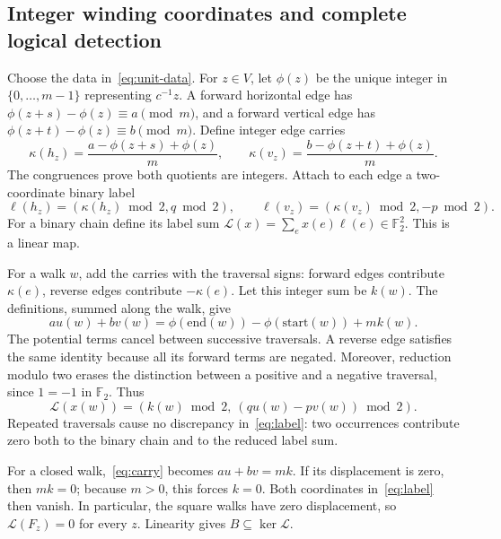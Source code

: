 \documentclass{article}
\numberwithin{equation}{section}
\begin{document}
\subsection{Integer winding coordinates and complete logical detection}\label{sec:I-winding}

Choose the data in~\eqref{eq:unit-data}. For \(z\in V\), let \(\phi(z)\) be the unique
integer in \(\{0,\ldots,m-1\}\) representing \(c^{-1}z\). A forward horizontal edge
has \(\phi(z+s)-\phi(z)\equiv a\pmod m\), and a forward vertical edge has
\(\phi(z+t)-\phi(z)\equiv b\pmod m\). Define integer edge carries
\begin{equation}\label{eq:carries}
  \kappa(h_z)=\frac{a-\phi(z+s)+\phi(z)}m,\qquad
  \kappa(v_z)=\frac{b-\phi(z+t)+\phi(z)}m.
\end{equation}
The congruences prove both quotients are integers. Attach to each edge a
two-coordinate binary label
\begin{equation}\label{eq:edge-labels}
  \ell(h_z)=(\kappa(h_z)\bmod2,q\bmod2),\qquad
  \ell(v_z)=(\kappa(v_z)\bmod2,-p\bmod2).
\end{equation}
For a binary chain define its label sum
\(\mathcal{L}(x)=\sum_e x(e)\ell(e)\in\mathbb F_2^2\). This is a linear map.

For a walk \(w\), add the carries with the traversal signs: forward edges
contribute \(\kappa(e)\), reverse edges contribute \(-\kappa(e)\). Let this
integer sum be \(k(w)\). The definitions, summed along the walk, give
\begin{equation}\label{eq:carry}
  a u(w)+b v(w)=\phi(\mathrm{end}(w))-\phi(\mathrm{start}(w))+m k(w).
\end{equation}
The potential terms cancel between successive traversals. A reverse edge
satisfies the same identity because all its forward terms are negated.
Moreover, reduction modulo two erases the distinction between a positive
and a negative traversal, since \(1=-1\) in \(\mathbb F_2\). Thus
\begin{equation}\label{eq:label}
  \mathcal{L}(x(w))=(k(w)\bmod2,\ (q u(w)-p v(w))\bmod2).
\end{equation}
Repeated traversals cause no discrepancy in~\eqref{eq:label}: two occurrences contribute
zero both to the binary chain and to the reduced label sum.

For a closed walk,~\eqref{eq:carry} becomes \(au+bv=mk\). If its displacement is zero,
then \(mk=0\); because \(m>0\), this forces \(k=0\). Both coordinates in~\eqref{eq:label}
then vanish. In particular, the square walks have zero displacement, so
\(\mathcal{L}(F_z)=0\) for every \(z\). Linearity gives \(B\subseteq\ker\mathcal{L}\).
\end{document}
